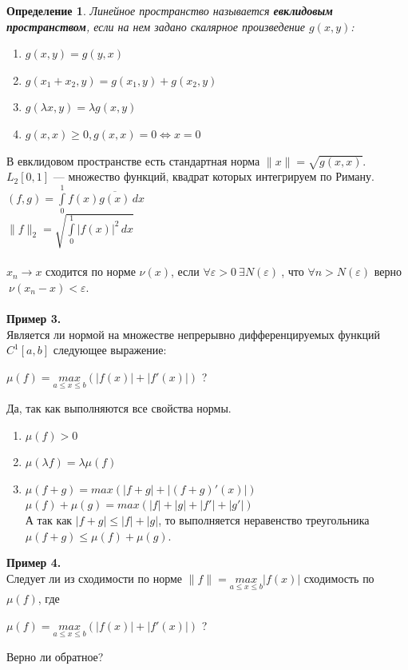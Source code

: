 \documentclass[12pt]{article}
\newtheorem*{definition}{Определение}
\begin{document}
	\begin{definition}
		Линейное пространство называется \textbf{евклидовым пространством}, если на нем задано скалярное произведение $g(x, y)$:\begin{enumerate}
			\item $g(x, y) = g(y, x)$
			\item $g(x_1+x_2, y) = g(x_1, y)+g(x_2, y)$
			\item $g(\lambda x, y) = \lambda g(x, y)$
			\item $g(x, x) \geqslant 0, g(x, x) = 0 \Leftrightarrow x = 0$
		\end{enumerate}
	\end{definition}
	В евклидовом пространстве есть стандартная норма $\parallel x \parallel = \sqrt{g(x, x)}$. 
	$L_2[0, 1]$ --- множество функций, квадрат которых интегрируем по Риману.\\
	$(f, g) = \int\limits_0^1 f(x) \overline{g(x)}\,dx$\\
	$\parallel f \parallel_2 = \sqrt{\int\limits_0^1 |f(x)|^2\,dx}$\\
	\\
	$x_n \to x$ $\textbf{сходится по норме}$ $\nu(x)$, если $\forall \varepsilon > 0 ~ \exists N(\varepsilon)~$, что $\forall n > N(\varepsilon)$ верно $~\nu(x_n - x) < \varepsilon$.\\ \\
	\textbf{Пример 3.}\\
	Является ли нормой на множестве непрерывно дифференцируемых функций $C^1[a, b]$ следующее выражение: \begin{center}$\mu(f) = \underset{a \leqslant x \leqslant b}{max}(|f(x)|+|f'(x)|)$ ?\end{center}
	Да, так как выполняются все свойства нормы.\begin{enumerate}
		\item $\mu(f) > 0$
		\item $\mu(\lambda f) = \lambda \mu(f)$
		\item $\mu(f+g) = max(|f+g|+|(f+g)'(x)|)$\\
		$\mu(f)+\mu(g) = max(|f|+|g|+|f'|+|g'|)$\\
		А так как $|f+g|\leqslant |f|+|g|$, то выполняется неравенство треугольника \\$\mu(f+g) \leqslant \mu(f) + \mu(g)$.\end{enumerate}
	\textbf{Пример 4.}\\ Следует ли из сходимости по норме $\parallel f \parallel = \underset{a \leqslant x \leqslant b}{max} |f(x)|$ сходимость по $\mu(f)$, где \begin{center}$\mu(f) = \underset{a \leqslant x \leqslant b}{max}(|f(x)|+|f'(x)|)$ ?\end{center} Верно ли обратное?\\ \\
\end{document}
